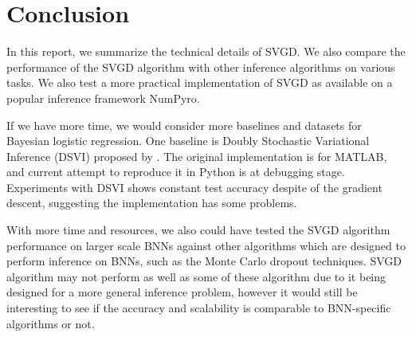 \section{Conclusion}
In this report, we summarize the technical details of SVGD. We also compare the performance of the SVGD algorithm with other inference algorithms on various tasks. We also test a more practical implementation of SVGD as available on a popular inference framework NumPyro.

If we have more time, we would consider more baselines and datasets for Bayesian logistic regression. One baseline is Doubly Stochastic Variational Inference (DSVI) proposed by \cite{ref_dsvi}. The original implementation is for MATLAB, and current attempt to reproduce it in Python is at debugging stage. Experiments with DSVI shows constant test accuracy despite of the gradient descent, suggesting the implementation has some problems.

With more time and resources, we also could have tested the SVGD algorithm performance on larger scale BNNs against other algorithms which are designed to perform inference on BNNs, such as the Monte Carlo dropout techniques. SVGD algorithm may not perform as well as some of these algorithm due to it being designed for a more general inference problem, however it would still be interesting to see if the accuracy and scalability is comparable to BNN-specific algorithms or not.